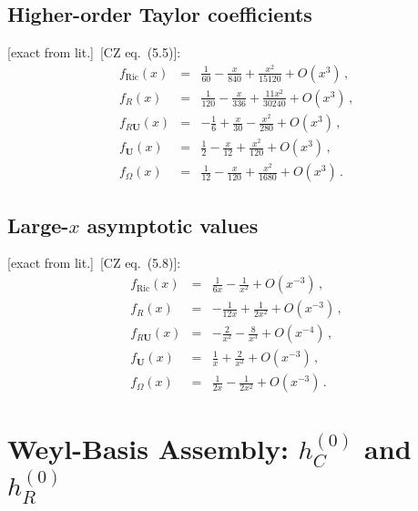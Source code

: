 \documentclass[12pt,a4paper]{article}
\theoremstyle{definition}
\theoremstyle{remark}
\newcommand{\fromlit}[1]{\textcolor{blue!70!black}{\textsf{[#1]}}}
\newcommand{\exactlit}{\textcolor{blue!60!black}{\textsf{[exact from lit.]}}}
\begin{document}
\subsection{Higher-order Taylor coefficients}

\exactlit\ \fromlit{CZ eq.~(5.5)}:
\begin{equation}
\renewcommand{\arraystretch}{1.3}
\begin{array}{lcl}
  f_{\mathrm{Ric}}(x) &=& \frac{1}{60} - \frac{x}{840}
    + \frac{x^2}{15120} + O(x^3)\,,\\[2pt]
  f_R(x) &=& \frac{1}{120} - \frac{x}{336}
    + \frac{11x^2}{30240} + O(x^3)\,,\\[2pt]
  f_{R\mathbf{U}}(x) &=& -\frac{1}{6} + \frac{x}{30}
    - \frac{x^2}{280} + O(x^3)\,,\\[2pt]
  f_{\mathbf{U}}(x) &=& \frac{1}{2} - \frac{x}{12}
    + \frac{x^2}{120} + O(x^3)\,,\\[2pt]
  f_\Omega(x) &=& \frac{1}{12} - \frac{x}{120}
    + \frac{x^2}{1680} + O(x^3)\,.
\end{array}
\label{eq:f-taylor}
\end{equation}

\subsection{Large-$x$ asymptotic values}

\exactlit\ \fromlit{CZ eq.~(5.8)}:
\begin{equation}
\renewcommand{\arraystretch}{1.3}
\begin{array}{lcl}
  f_{\mathrm{Ric}}(x) &=& \frac{1}{6x} - \frac{1}{x^2}
    + O(x^{-3})\,,\\[2pt]
  f_R(x) &=& -\frac{1}{12x} + \frac{1}{2x^2}
    + O(x^{-3})\,,\\[2pt]
  f_{R\mathbf{U}}(x) &=& -\frac{2}{x^2}
    - \frac{8}{x^3} + O(x^{-4})\,,\\[2pt]
  f_{\mathbf{U}}(x) &=& \frac{1}{x} + \frac{2}{x^2}
    + O(x^{-3})\,,\\[2pt]
  f_\Omega(x) &=& \frac{1}{2x} - \frac{1}{2x^2}
    + O(x^{-3})\,.
\end{array}
\label{eq:f-large-x}
\end{equation}


\section{Weyl-Basis Assembly: $h_C^{(0)}$ and $h_R^{(0)}$}
\label{sec:weyl-assembly}
\end{document}
